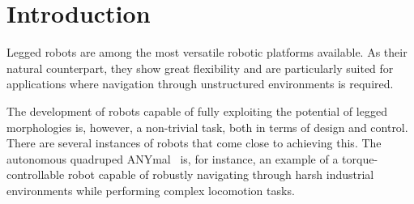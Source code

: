\section{Introduction}\label{sec:introduction}

 Legged robots are among the most versatile robotic platforms available. As their natural counterpart, they show great flexibility and are particularly suited for applications where navigation through unstructured environments is required. 

The development of robots capable of fully exploiting the potential of legged morphologies is, however, a non-trivial task, both in terms of design and control. There are several instances of robots that come close to achieving this.
The autonomous quadruped ANYmal~\cite{agile_bots::hutter2016anymal} is, for instance, an example of a torque-controllable robot capable of robustly navigating through harsh industrial environments while performing complex locomotion tasks.

